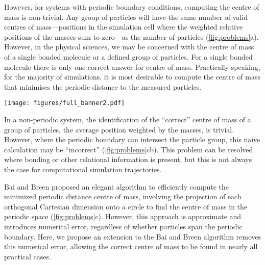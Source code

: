 \documentclass[reprint,superscriptaddress,nobibnotes,amsmath,amssymb,aip]{revtex4-2}
\begin{document}
However, for systems with periodic boundary conditions, computing the centre of mass is non-trivial. 
Any group of particles will have the same number of valid centres of mass---positions in the simulation cell where the weighted relative positions of the masses sum to zero---as the number of particles (\cref{fig:problems}a). 
However, in the physical sciences, we may be concerned with the centre of mass of a single bonded molecule or a defined group of particles. 
For a single bonded molecule there is only one correct answer for centre of mass.
Practically speaking, for the majority of simulations, it is most desirable to compute the centre of mass that minimises the periodic distance to the measured particles.
%
\begin{figure*}
  \texttt{[image: figures/full\_banner2.pdf]}
  \caption{
  (a) Demonstration of the $N$ possible centres of mass in an $N$ particle system, where there are two periodic cells visible and the dashed line indicates the particle grouping that leads to a given centre of mass (cross). 
  (b) The problem with the naive centre of mass (red cross) calculation in periodic systems, where the particle group spans a periodic boundary. 
  (c) The projection of the particles in the bottom diagram of (b) onto a circle to find the centre of mass, which minimises the weighted distance to all particles.}
  \label{fig:problems}
\end{figure*}
%
In a non-periodic system, the identification of the ``correct'' centre of mass of a group of particles, the average position weighted by the masses, is trivial. 
However, where the periodic boundary can intersect the particle group, this naive calculation may be ``incorrect'' (\cref{fig:problems}cb). 
This problem can be resolved where bonding or other relational information is present, but this is not always the case for computational simulation trajectories. 

Bai and Breen proposed an elegant algorithm to efficiently compute the minimized periodic distance centre of mass\cite{bai_calculating_2008}, involving the projection of each orthogonal Cartesian dimension onto a circle to find the centre of mass in the periodic space (\cref{fig:problems}c). 
However, this approach is approximate and introduces numerical error, regardless of whether particles span the periodic boundary. 
Here, we propose an extension to the Bai and Breen algorithm removes this numerical error, allowing the correct centre of mass to be found in nearly all practical cases. 
\end{document}
